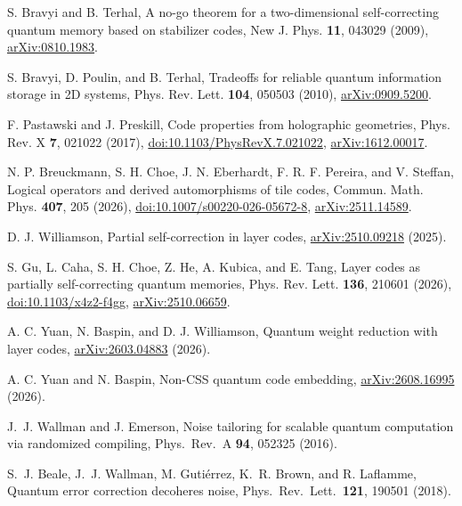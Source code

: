 S. Bravyi and B. Terhal, A no-go theorem for a two-dimensional self-correcting quantum memory based on stabilizer codes, New J. Phys. \textbf{11}, 043029 (2009), \href{https://arxiv.org/abs/0810.1983}{arXiv:0810.1983}.

S. Bravyi, D. Poulin, and B. Terhal, Tradeoffs for reliable quantum information storage in 2D systems, Phys. Rev. Lett. \textbf{104}, 050503 (2010), \href{https://arxiv.org/abs/0909.5200}{arXiv:0909.5200}.

F. Pastawski and J. Preskill, Code properties from holographic geometries, Phys. Rev. X \textbf{7}, 021022 (2017), \href{https://doi.org/10.1103/PhysRevX.7.021022}{doi:10.1103/PhysRevX.7.021022}, \href{https://arxiv.org/abs/1612.00017}{arXiv:1612.00017}.

N. P. Breuckmann, S. H. Choe, J. N. Eberhardt, F. R. F. Pereira, and V. Steffan, Logical operators and derived automorphisms of tile codes, Commun. Math. Phys. \textbf{407}, 205 (2026), \href{https://doi.org/10.1007/s00220-026-05672-8}{doi:10.1007/s00220-026-05672-8}, \href{https://arxiv.org/abs/2511.14589}{arXiv:2511.14589}.

D. J. Williamson, Partial self-correction in layer codes, \href{https://arxiv.org/abs/2510.09218}{arXiv:2510.09218} (2025).

S. Gu, L. Caha, S. H. Choe, Z. He, A. Kubica, and E. Tang, Layer codes as partially self-correcting quantum memories, Phys. Rev. Lett. \textbf{136}, 210601 (2026), \href{https://doi.org/10.1103/x4z2-f4gg}{doi:10.1103/x4z2-f4gg}, \href{https://arxiv.org/abs/2510.06659}{arXiv:2510.06659}.

A. C. Yuan, N. Baspin, and D. J. Williamson, Quantum weight reduction with layer codes, \href{https://arxiv.org/abs/2603.04883}{arXiv:2603.04883} (2026).

A. C. Yuan and N. Baspin, Non-CSS quantum code embedding, \href{https://arxiv.org/abs/2608.16995}{arXiv:2608.16995} (2026).

J.~J. Wallman and J. Emerson, Noise tailoring for scalable quantum computation via randomized compiling, Phys.\ Rev.\ A \textbf{94}, 052325 (2016).

S.~J. Beale, J.~J. Wallman, M. Guti\'errez, K.~R. Brown, and R. Laflamme, Quantum error correction decoheres noise, Phys.\ Rev.\ Lett.\ \textbf{121}, 190501 (2018).

